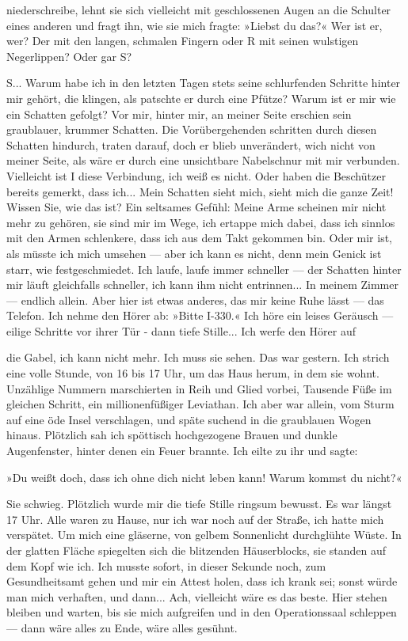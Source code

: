 niederschreibe, lehnt sie sich vielleicht mit geschlossenen Augen
an die Schulter eines anderen und fragt ihn, wie sie mich fragte:
»Liebst du das?« Wer ist er, wer? Der mit den langen, schmalen
Fingern oder R mit seinen wulstigen Negerlippen? Oder gar S?

S... Warum habe ich in den letzten Tagen stets seine schlurfenden
Schritte hinter mir gehört, die klingen, als patschte er durch eine
Pfütze? Warum ist er mir wie ein Schatten gefolgt? Vor mir, hinter
mir, an meiner Seite erschien sein graublauer, krummer Schatten.
Die Vor­übergehenden schritten durch diesen Schatten hindurch,
traten darauf, doch er blieb unverändert, wich nicht von meiner
Seite, als wäre er durch eine unsichtbare Nabelschnur mit mir
verbunden. Vielleicht ist I diese Verbindung, ich weiß es nicht.
Oder haben die Beschützer bereits gemerkt, dass ich... Mein
Schatten sieht mich, sieht mich die ganze Zeit! Wissen Sie, wie das
ist? Ein seltsames Gefühl: Meine Arme scheinen mir nicht mehr zu
gehören, sie sind mir im Wege, ich ertappe mich dabei, dass ich
sinnlos mit den Armen schlenkere, dass ich aus dem Takt gekommen
bin. Oder mir ist, als müsste ich mich umsehen — aber ich kann es
nicht, denn mein Genick ist starr, wie festgeschmiedet. Ich laufe,
laufe immer schneller — der Schatten hinter mir läuft gleichfalls
schneller, ich kann ihm nicht entrinnen... In meinem Zimmer —
endlich allein. Aber hier ist etwas anderes, das mir keine Ruhe
lässt — das Telefon. Ich nehme den Hörer ab: »Bitte I-330.« Ich
höre ein leises Geräusch — eilige Schritte vor ihrer Tür - dann
tiefe Stille... Ich werfe den Hörer auf

die Gabel, ich kann nicht mehr. Ich muss sie sehen. Das war
gestern. Ich strich eine volle Stunde, von 16 bis 17 Uhr, um das
Haus herum, in dem sie wohnt. Unzählige Nummern marschierten in
Reih und Glied vorbei, Tausende Füße im gleichen Schritt, ein
millionenfüßiger Leviathan. Ich aber war allein, vom Sturm auf eine
öde Insel verschlagen, und späte suchend in die graublauen Wogen
hinaus. Plötzlich sah ich spöttisch hochgezogene Brauen und dunkle
Augenfenster, hinter denen ein Feuer brannte. Ich eilte zu ihr und
sagte:

»Du weißt doch, dass ich ohne dich nicht leben kann! Warum kommst
du nicht?«

Sie schwieg. Plötzlich wurde mir die tiefe Stille ringsum bewusst.
Es war längst 17 Uhr. Alle waren zu Hause, nur ich war noch auf der
Straße, ich hatte mich verspätet. Um mich eine gläserne, von gelbem
Sonnenlicht durchglühte Wüste. In der glatten Fläche spiegelten
sich die blitzenden Häuserblocks, sie standen auf dem Kopf wie ich.
Ich musste sofort, in dieser Sekunde noch, zum Gesundheitsamt gehen
und mir ein Attest holen, dass ich krank sei; sonst würde man mich
verhaften, und dann... Ach, vielleicht wäre es das beste. Hier
stehen bleiben und warten, bis sie mich aufgreifen und in den
Operationssaal schleppen — dann wäre alles zu Ende, wäre alles
gesühnt.


